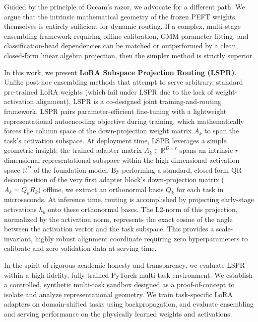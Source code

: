 Guided by the principle of Occam's razor, we advocate for a different path. We argue that the intrinsic mathematical geometry of the frozen PEFT weights themselves is entirely sufficient for dynamic routing. If a complex, multi-stage ensembling framework requiring offline calibration, GMM parameter fitting, and classification-head dependencies can be matched or outperformed by a clean, closed-form linear algebra projection, then the simpler method is strictly superior.

In this work, we present \textbf{LoRA Subspace Projection Routing (LSPR)}. Unlike post-hoc ensembling methods that attempt to serve arbitrary, standard pre-trained LoRA weights (which fail under LSPR due to the lack of weight-activation alignment), LSPR is a co-designed joint training-and-routing framework. LSPR pairs parameter-efficient fine-tuning with a lightweight representational autoencoding objective during training, which mathematically forces the column space of the down-projection weight matrix $A_k$ to span the task's activation subspace. At deployment time, LSPR leverages a simple geometric insight: the trained adapter matrix $A_k \in \mathbb{R}^{D \times r}$ spans an intrinsic $r$-dimensional representational subspace within the high-dimensional activation space $\mathbb{R}^D$ of the foundation model. By performing a standard, closed-form QR decomposition of the very first adapter block's down-projection matrix ($A_k = Q_k R_k$) offline, we extract an orthonormal basis $Q_k$ for each task in microseconds. At inference time, routing is accomplished by projecting early-stage activations $h_b$ onto these orthonormal bases. The L2-norm of this projection, normalized by the activation norm, represents the exact cosine of the angle between the activation vector and the task subspace. This provides a scale-invariant, highly robust alignment coordinate requiring zero hyperparameters to calibrate and zero validation data at serving time.

In the spirit of rigorous academic honesty and transparency, we evaluate LSPR within a high-fidelity, fully-trained PyTorch multi-task environment. We establish a controlled, synthetic multi-task sandbox designed as a proof-of-concept to isolate and analyze representational geometry. We train task-specific LoRA adapters on domain-shifted tasks using backpropagation, and evaluate ensembling and serving performance on the physically learned weights and activations.

